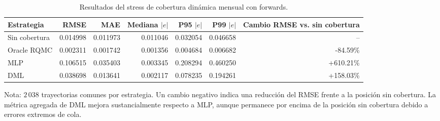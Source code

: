 \begin{table}[htbp]
\centering
\caption{Resultados del stress de cobertura dinámica mensual con forwards.}
\label{tab:dynamic_forward_metrics}
\small
\begin{tabular}{lrrrrrr}
\toprule
Estrategia & RMSE & MAE & Mediana $|e|$ & P95 $|e|$ & P99 $|e|$ & Cambio RMSE vs. sin cobertura \\
\midrule
Sin cobertura & 0.014998 & 0.011973 & 0.011046 & 0.032054 & 0.046658 & -- \\
Oracle RQMC & 0.002311 & 0.001742 & 0.001356 & 0.004684 & 0.006682 & -84.59\% \\
MLP & 0.106515 & 0.035403 & 0.003345 & 0.208294 & 0.460250 & +610.21\% \\
DML & 0.038698 & 0.013641 & 0.002117 & 0.078235 & 0.194261 & +158.03\% \\
\bottomrule
\end{tabular}
\begin{flushleft}
\footnotesize
Nota: $2\,038$ trayectorias comunes por estrategia. Un cambio negativo indica una reducción del RMSE frente a la posición sin cobertura.
La métrica agregada de DML mejora sustancialmente respecto a MLP, aunque permanece por encima de la posición sin cobertura debido a errores extremos de cola.
\end{flushleft}
\end{table}
